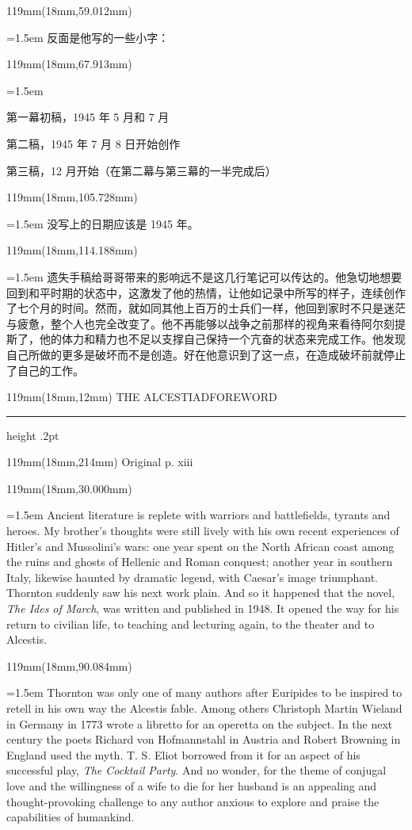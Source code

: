\documentclass{article}
\newcommand{\ENsetup}{\normalfont\color{ink}\fontsize{11}{16.5}\selectfont\emergencystretch=1.5em}
\newcommand{\ZHsetup}{\normalfont\color{ink}\fontsize{10.5}{17}\selectfont\emergencystretch=1.5em}
\newcommand{\Block}[3]{\begin{textblock*}{119mm}(18mm,#1mm){#2 #3\par}\end{textblock*}}
\newcommand{\Heading}[3]{%
  \begin{textblock*}{119mm}(18mm,12mm)
    \color{quiet}\fontsize{7.5}{10}\selectfont
    #1\hfill #2\par\vspace{3mm}\hrule height .2pt
  \end{textblock*}
  \begin{textblock*}{119mm}(18mm,214mm)
    \color{quiet}\fontsize{7}{10}\selectfont #3\hfill\thepage
  \end{textblock*}
}
\begin{document}
\Block{59.012}{\ZHsetup}{反面是他写的一些小字：\par }
\Block{67.913}{\ZHsetup}{\leftskip=4mm\rightskip=3mm\kai {\kai （第一幕戏的草稿，包括有忒瑞西阿斯的场景，都在战争前完成，已经遗失）}\par 第一幕初稿，1945 年 5 月和 7 月\par 第二稿，1945 年 7 月 8 日开始创作\par 第三稿，12 月开始{\kai （在第二幕与第三幕的一半完成后）}\par }
\Block{105.728}{\ZHsetup}{没写上的日期应该是 1945 年。\par }
\Block{114.188}{\ZHsetup}{遗失手稿给哥哥带来的影响远不是这几行笔记可以传达的。他急切地想要回到和平时期的状态中，这激发了他的热情，让他如记录中所写的样子，连续创作了七个月的时间。然而，就如同其他上百万的士兵们一样，他回到家时不只是迷茫与疲惫，整个人也完全改变了。他不再能够以战争之前那样的视角来看待阿尔刻提斯了，他的体力和精力也不足以支撑自己保持一个亢奋的状态来完成工作。他发现自己所做的更多是破坏而不是创造。好在他意识到了这一点，在造成破坏前就停止了自己的工作。\par }
\newpage
\null
\Heading{THE ALCESTIAD}{FOREWORD}{Original p. xiii}
\Block{30.000}{\ENsetup}{Ancient literature is replete with warriors and battlefields, tyrants and heroes. My brother's thoughts were still lively with his own recent experiences of Hitler's and Mussolini's wars: one year spent on the North African coast among the ruins and ghosts of Hellenic and Roman conquest; another year in southern Italy, likewise haunted by dramatic legend, with Caesar's image triumphant. Thornton suddenly saw his next work plain. And so it happened that the novel, \textit{The Ides of March}, was written and published in 1948. It opened the way for his return to civilian life, to teaching and lecturing again, to the theater and to Alcestis.\par}
\Block{90.084}{\ENsetup}{Thornton was only one of many authors after Euripides to be inspired to retell in his own way the Alcestis fable. Among others Christoph Martin Wieland in Germany in 1773 wrote a libretto for an operetta on the subject. In the next century the poets Richard von Hofmannstahl in Austria and Robert Browning in England used the myth. T. S. Eliot borrowed from it for an aspect of his successful play, \textit{The Cocktail Party}. And no wonder, for the theme of conjugal love and the willingness of a wife to die for her husband is an appealing and thought-provoking challenge to any author anxious to explore and praise the capabilities of humankind.\par}
\end{document}

